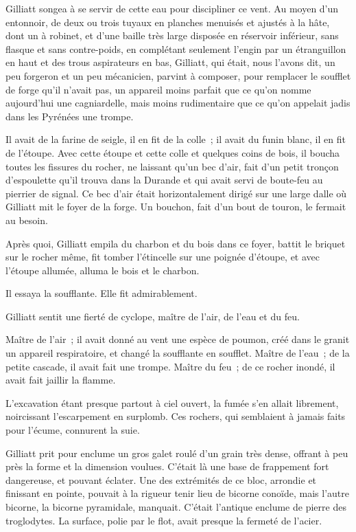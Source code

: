 \documentclass[french,twoside]{book} %
\begin{document}
Gilliatt songea à se servir de cette eau pour discipliner ce vent. Au moyen d’un entonnoir, de deux ou trois tuyaux en planches menuisés et ajustés à la hâte, dont un à robinet, et d’une baille très large disposée en réservoir inférieur, sans flasque et sans contre-poids, en complétant seulement l’engin par un étranguillon en haut et des trous aspirateurs en bas, Gilliatt, qui était, nous l’avons dit, un peu forgeron et un peu mécanicien, parvint à composer, pour remplacer le soufflet de forge qu’il n’avait pas, un appareil moins parfait que ce qu’on nomme aujourd’hui une cagniardelle, mais moins rudimentaire que ce qu’on appelait jadis dans les Pyrénées une trompe.\par
Il avait de la farine de seigle, il en fit de la colle ; il avait du funin blanc, il en fit de l’étoupe. Avec cette étoupe et cette colle et quelques coins de bois, il boucha toutes les fissures du rocher, ne laissant qu’un bec d’air, fait d’un petit tronçon d’espoulette qu’il trouva dans la Durande et qui avait servi de boute-feu au pierrier de signal. Ce bec d’air était horizontalement dirigé sur une large dalle où Gilliatt mit le foyer de la forge. Un bouchon, fait d’un bout de touron, le fermait au besoin.\par
Après quoi, Gilliatt empila du charbon et du bois dans ce foyer, battit le briquet sur le rocher même, fit tomber l’étincelle sur une poignée d’étoupe, et avec l’étoupe allumée, alluma le bois et le charbon.\par
Il essaya la soufflante. Elle fit admirablement.\par
 Gilliatt sentit une fierté de cyclope, maître de l’air, de l’eau et du feu.\par
Maître de l’air ; il avait donné au vent une espèce de poumon, créé dans le granit un appareil respiratoire, et changé la soufflante en soufflet. Maître de l’eau ; de la petite cascade, il avait fait une trompe. Maître du feu ; de ce rocher inondé, il avait fait jaillir la flamme.\par
L’excavation étant presque partout à ciel ouvert, la fumée s’en allait librement, noircissant l’escarpement en surplomb. Ces rochers, qui semblaient à jamais faits pour l’écume, connurent la suie.\par
Gilliatt prit pour enclume un gros galet roulé d’un grain très dense, offrant à peu près la forme et la dimension voulues. C’était là une base de frappement fort dangereuse, et pouvant éclater. Une des extrémités de ce bloc, arrondie et finissant en pointe, pouvait à la rigueur tenir lieu de bicorne conoïde, mais l’autre bicorne, la bicorne pyramidale, manquait. C’était l’antique enclume de pierre des troglodytes. La surface, polie par le flot, avait presque la fermeté de l’acier.\par
\end{document}
